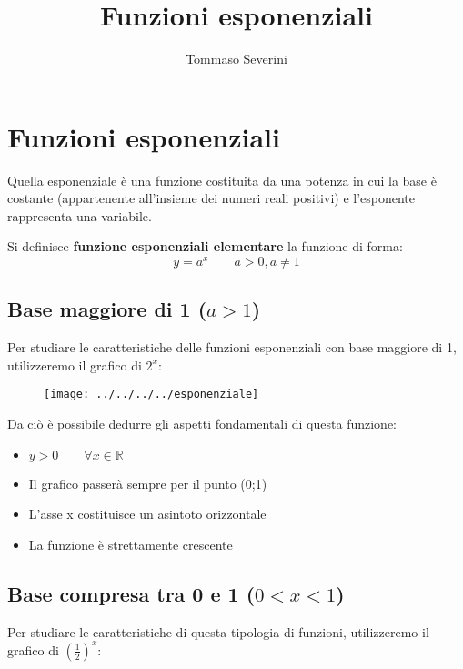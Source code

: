 \documentclass[10pt, a4paper]{article}
\author{Tommaso Severini}
\title{Funzioni esponenziali}
\theoremstyle{remark}
\begin{document}
	\maketitle
	
\section*{Funzioni esponenziali}
	
	Quella esponenziale è una funzione costituita da una potenza in cui la base è costante (appartenente all'insieme dei numeri reali positivi) e l'esponente rappresenta una variabile.
	
	\begin{definition*}
		Si definisce \textbf{funzione esponenziali elementare} la funzione di forma:
		$$ y = a^x \qquad a>0, a \neq 1 $$
	\end{definition*}

\subsection*{Base maggiore di 1 ($a>1$)}

Per studiare le caratteristiche delle funzioni esponenziali con base maggiore di 1, utilizzeremo il grafico di $2^x$: 


\begin{figure}[h]
	\centering
	\texttt{[image: ../../../../esponenziale]}
	\caption*{}
	\label{fig:esponenziale}
\end{figure}

Da ciò è possibile dedurre gli aspetti fondamentali di questa funzione:

\begin{itemize}
	\item $y>0 \qquad \forall x \in \mathbb{R}$
	\item Il grafico passerà sempre per il punto (0;1)
	\item L'asse x costituisce un asintoto orizzontale
	\item La funzione è strettamente crescente
\end{itemize}

\newpage

\subsection*{Base compresa tra 0 e 1 ($0<x<1$)}

Per studiare le caratteristiche di questa tipologia di funzioni, utilizzeremo il grafico di $\left( \frac{1}{2}\right)^x$:
\end{document}
